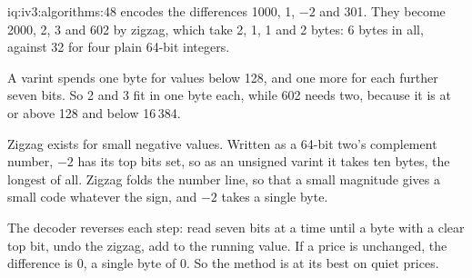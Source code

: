 \begin{solution}{iq:iv3:algorithms:48}
 encodes the differences 1000, 1, $-2$ and 301. They become 2000, 2, 3 and 602 by zigzag, which take 2, 1, 1 and 2 bytes: 6 bytes in all, against 32 for four plain 64-bit integers.
\enlargethispage{-3\baselineskip}%
\label{lst:iv3:al:varint}

A varint spends one byte for values below 128, and one more for each further seven bits. So 2 and 3 fit in one byte each, while 602 needs two, because it is at or above 128 and below 16\,384.

Zigzag exists for small negative values. Written as a 64-bit two's complement number, $-2$ has its top bits set, so as an unsigned varint it takes ten bytes, the longest of all. Zigzag folds the number line, so that a small magnitude gives a small code whatever the sign, and $-2$ takes a single byte.

The decoder reverses each step: read seven bits at a time until a byte with a clear top bit, undo the zigzag, add to the running value. If a price is unchanged, the difference is 0, a single byte of 0. So the method is at its best on quiet prices.

\end{solution}

